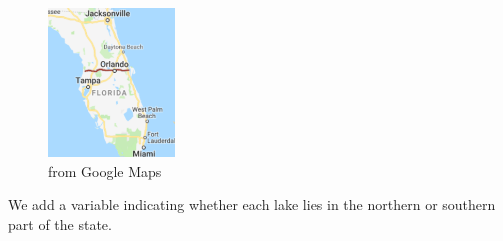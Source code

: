 \documentclass[
  letterpaper,
  DIV=11,
  numbers=noendperiod]{scrreprt}
\begin{document}
\begin{figure}[H]

{\centering \includegraphics[width=0.3\textwidth,height=\textheight]{Florida.png}

}

\caption{from Google Maps}

\end{figure}%

We add a variable indicating whether each lake lies in the northern or
southern part of the state.
\end{document}
